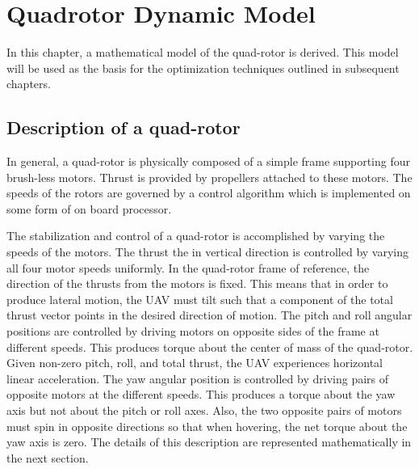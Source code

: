 
\chapter{Quadrotor Dynamic Model} %

\label{Chapter2} %



In this chapter, a mathematical model of the quad-rotor is derived. This model will be used as the basis for the optimization techniques outlined in subsequent chapters.

\section{Description of a quad-rotor}

In general, a quad-rotor is physically composed of a simple frame supporting four brush-less motors. Thrust is provided by propellers attached to these motors. The speeds of the rotors are governed by a control algorithm which is implemented on some form of on board processor.

 The stabilization and control of a quad-rotor is accomplished by varying the speeds of the motors. The thrust the in vertical direction is controlled by varying all four motor speeds uniformly. In the quad-rotor frame of reference, the direction of the thrusts from the motors is fixed. This means that in order to produce lateral motion, the UAV must tilt such that a component of the total thrust vector points in the desired direction of motion. The pitch and roll angular positions are controlled by driving motors on opposite sides of the frame at different speeds. This produces torque about the center of mass of the quad-rotor. Given non-zero pitch, roll, and total thrust, the UAV experiences horizontal linear acceleration. The yaw angular position is controlled by driving pairs of opposite motors at the different speeds. This produces a torque about the yaw axis but not about the pitch or roll axes. Also, the two opposite pairs of motors must spin in opposite directions so that when hovering, the net torque about the yaw axis is zero. The details of this description are represented mathematically in the next section.



